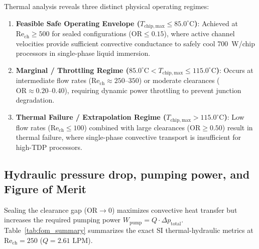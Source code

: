 Thermal analysis reveals three distinct physical operating regimes:
\begin{enumerate}
\item \textbf{Feasible Safe Operating Envelope ($T_{\mathrm{chip,max}} \le 85.0^\circ\mathrm{C}$)}: Achieved at $\mathrm{Re}_{\mathrm{ch}} \ge 500$ for sealed configurations ($\mathrm{OR} \le 0.15$), where active channel velocities provide sufficient convective conductance to safely cool 700~W/chip processors in single-phase liquid immersion.
\item \textbf{Marginal / Throttling Regime ($85.0^\circ\mathrm{C} < T_{\mathrm{chip,max}} \le 115.0^\circ\mathrm{C}$)}: Occurs at intermediate flow rates ($\mathrm{Re}_{\mathrm{ch}} \approx 250\text{--}350$) or moderate clearances ($\mathrm{OR} \approx 0.20\text{--}0.40$), requiring dynamic power throttling to prevent junction degradation.
\item \textbf{Thermal Failure / Extrapolation Regime ($T_{\mathrm{chip,max}} > 115.0^\circ\mathrm{C}$)}: Low flow rates ($\mathrm{Re}_{\mathrm{ch}} \le 100$) combined with large clearances ($\mathrm{OR} \ge 0.50$) result in thermal failure, where single-phase convective transport is insufficient for high-TDP processors.
\end{enumerate}

\subsection{Hydraulic pressure drop, pumping power, and Figure of Merit}
\label{sec:res_hydraulics_fom}

Sealing the clearance gap ($\mathrm{OR} \to 0$) maximizes convective heat transfer but increases the required pumping power $W_{\mathrm{pump}} = Q \cdot \Delta p_{\mathrm{total}}$. Table~\ref{tab:fom_summary} summarizes the exact SI thermal-hydraulic metrics at $\mathrm{Re}_{\mathrm{ch}} = 250$ ($Q = 2.61\text{ LPM}$).

